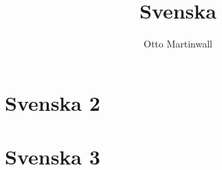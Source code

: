 

\title{Svenska}
\author{Otto Martinwall}


\maketitle
\tableofcontents
\newpage

\newtheorem{definition}{Definition}
\newtheorem{theorem}{Theorem}

\section{Svenska 2}


\section{Svenska 3}

